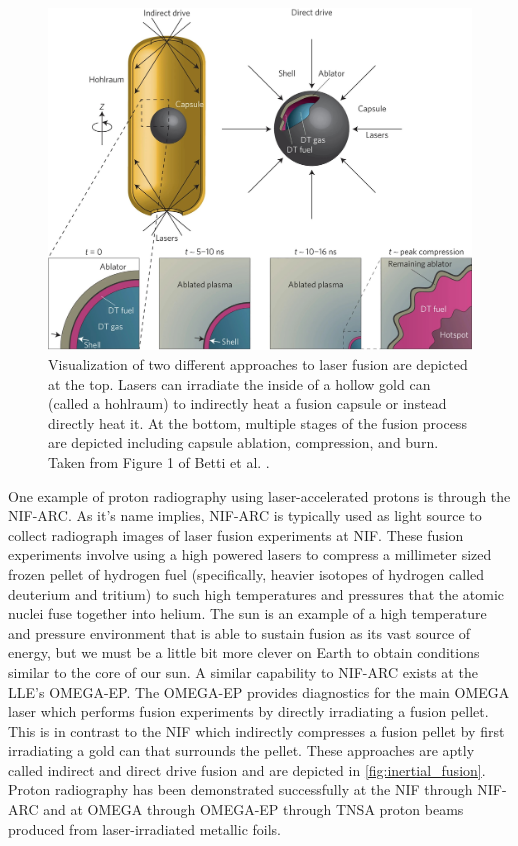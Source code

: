 \begin{figure}
	\centering
	\includegraphics[width=0.9\linewidth]{planning/images/fusion.png}
	\caption{Visualization of two different approaches to laser fusion are depicted at the top. Lasers can irradiate the inside of a hollow gold can (called a hohlraum) to indirectly heat a fusion capsule or instead directly heat it. At the bottom, multiple stages of the fusion process are depicted including capsule ablation, compression, and burn. Taken from Figure 1 of Betti et al. \cite{Betti_2016_Nature}. }
	\label{fig:inertial_fusion}
\end{figure}

One example of proton radiography using laser-accelerated protons is through the \gls{NIF-ARC}. As it's name implies, \gls{NIF-ARC} is typically used as light source to collect radiograph images of laser fusion experiments at NIF. These fusion experiments involve using a high powered lasers to compress a millimeter sized frozen pellet of hydrogen fuel (specifically, heavier isotopes of hydrogen called deuterium and tritium) to such high temperatures and pressures that the atomic nuclei fuse together into helium. The sun is an example of a high temperature and pressure environment that is able to sustain fusion as its vast source of energy, but we must be a little bit more clever on Earth to obtain conditions similar to the core of our sun. A similar capability to NIF-ARC exists at the \gls{LLE}'s \gls{OMEGA-EP}. The \gls{OMEGA-EP} provides diagnostics for the main OMEGA laser which performs fusion experiments by directly irradiating a fusion pellet. This is in contrast to the \gls{NIF} which indirectly compresses a fusion pellet by first irradiating a gold can that surrounds the pellet. These approaches are aptly called indirect and direct drive fusion and are depicted in \autoref{fig:inertial_fusion}. Proton radiography has been demonstrated successfully at the \gls{NIF} through \gls{NIF-ARC} \cite{Simpson_2021_PPCF} and at OMEGA through \gls{OMEGA-EP} \cite{Zylstra_2012_RSI} through \gls{TNSA} proton beams produced from laser-irradiated metallic foils.

